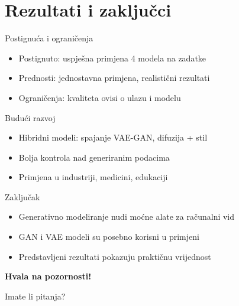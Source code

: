 \documentclass[aspectratio=169, xcolor=dvipsnames]{beamer}
\begin{document}
	\section{Rezultati i zaključci}
	
	\begin{frame}{Postignuća i ograničenja}
		\begin{itemize}
			\item Postignuto: uspješna primjena 4 modela na zadatke
			\item Prednosti: jednostavna primjena, realistični rezultati
			\item Ograničenja: kvaliteta ovisi o ulazu i modelu
		\end{itemize}
	\end{frame}
	
	\begin{frame}{Budući razvoj}
		\begin{itemize}
			\item Hibridni modeli: spajanje VAE-GAN, difuzija + stil
			\item Bolja kontrola nad generiranim podacima
			\item Primjena u industriji, medicini, edukaciji
		\end{itemize}
	\end{frame}
	
	\begin{frame}{Zaključak}
		\begin{itemize}
			\item Generativno modeliranje nudi moćne alate za računalni vid
			\item GAN i VAE modeli su posebno korisni u primjeni
			\item Predstavljeni rezultati pokazuju praktičnu vrijednost
		\end{itemize}
	\end{frame}
	
	\begin{frame}
		\Huge{\centerline{\textbf{Hvala na pozornosti!}}}
		\Large{\centerline{Imate li pitanja?}}
	\end{frame}
	
\end{document}
